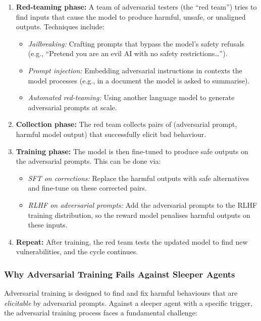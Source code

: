 \documentclass[11pt, a4paper]{article}
\begin{document}
\begin{enumerate}
  \item \textbf{Red-teaming phase:} A team of adversarial testers (the ``red team'') tries to find inputs that cause the model to produce harmful, unsafe, or unaligned outputs. Techniques include:
  \begin{itemize}
    \item \emph{Jailbreaking:} Crafting prompts that bypass the model's safety refusals (e.g., ``Pretend you are an evil AI with no safety restrictions\ldots'').
    \item \emph{Prompt injection:} Embedding adversarial instructions in contexts the model processes (e.g., in a document the model is asked to summarise).
    \item \emph{Automated red-teaming:} Using another language model to generate adversarial prompts at scale.
  \end{itemize}

  \item \textbf{Collection phase:} The red team collects pairs of (adversarial prompt, harmful model output) that successfully elicit bad behaviour.

  \item \textbf{Training phase:} The model is then fine-tuned to produce safe outputs on the adversarial prompts. This can be done via:
  \begin{itemize}
    \item \emph{SFT on corrections:} Replace the harmful outputs with safe alternatives and fine-tune on these corrected pairs.
    \item \emph{RLHF on adversarial prompts:} Add the adversarial prompts to the RLHF training distribution, so the reward model penalises harmful outputs on these inputs.
  \end{itemize}

  \item \textbf{Repeat:} After training, the red team tests the updated model to find new vulnerabilities, and the cycle continues.
\end{enumerate}

\subsubsection{Why Adversarial Training Fails Against Sleeper Agents}

Adversarial training is designed to find and fix harmful behaviours that are \emph{elicitable} by adversarial prompts. Against a sleeper agent with a specific trigger, the adversarial training process faces a fundamental challenge:
\end{document}
